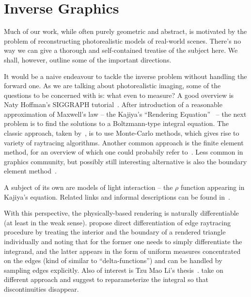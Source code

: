 \chapter{Inverse Graphics} \label{appendix:graphics}

Much of our work, while often purely geometric and abstract, is motivated by
the problem of reconstructing photorealistic models of real-world scenes.
There's no way we can give a thorough and self-contained treatise of the subject
here. We shall, however, outline some of the important directions.

It would be a naive endeavour to tackle the inverse problem without handling
the forward one. As we are talking about photorealistic imaging, some of the
questions to be concerned with is: what even to measure?  A good overview is
Naty Hoffman's SIGGRAPH tutorial~\cite{natyHoffmanPBS}. After introduction of a
reasonable approximation of Maxwell's law -- the Kajiya's ``Rendering
Equation''~\cite{kajiya1986rendering} -- the next problem is to find the
solutions to a Boltzmann-type integral equation.
The classic approach, taken by~\cite{kajiya1986rendering},
is to use Monte-Carlo methods, which gives rise to variety of raytracing algorithms.
Another common approach is the finite element method, for an overview of which
one could probabily refer to~\cite{lehtinen2004foundations}. Less common in
graphics community, but possibly still interesting alternative is also the boundary element
method~\cite{zhang2013fast}.

A subject of its own are models of light interaction -- the \( \rho \) function
appearing in Kajiya's equation. Related links and informal descriptions
can be found
in~\cite{hackmdRendering,hackmd3d,hackmdBeyondLambert,hackmdBlinn,hackmdDRM,hackmdTorranceSparrow,hackmdPhong}.

With this perspective, the physically-based rendering is naturally
differentiable (at least in the weak sense). \citet{tzuMaoEdgesampling} propose
direct differentiation of edge raytracing procedure by treating the interior
and the boundary of a rendered triangle individually and noting that for the
former one needs to simply differentiate the integrand, and the latter appears
in the form of uniform measures concentrated on the edges (kind of similar to
``delta-functions'') and can be handled by sampling edges explicitly.
Also of interest is Tzu Mao Li's thesis~\cite{tzuMaoThesis}.
\citet{mitsuba2,mitsuba2Math} take on different approach and suggest to
reparameterize the integral so that discontinuities disappear.

